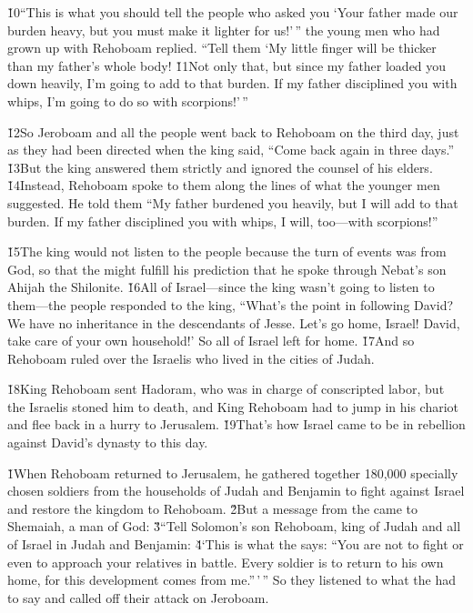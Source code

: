 \v{10}``This is what you should tell the people who asked you `Your father made our burden heavy, but you must make it lighter for us!'\,'' the young men who had grown up with Rehoboam replied. ``Tell them `My little finger will be thicker than my father's whole body! \v{11}Not only that, but since my father loaded you down heavily, I'm going to add to that burden. If my father disciplined you with whips, I'm going to do so with scorpions!'\,''

\v{12}So Jeroboam and all the people went back to Rehoboam on the third day, just as they had been directed when the king said, ``Come back again in three days.'' \v{13}But the king answered them strictly and ignored the counsel of his elders. \v{14}Instead, Rehoboam spoke to them along the lines of what the younger men suggested. He told them ``My father burdened you heavily, but I will add to that burden. If my father disciplined you with whips, I will, too---with scorpions!''

\v{15}The king would not listen to the people because the turn of events was from God, so that the  might fulfill his prediction that he spoke through Nebat's son Ahijah the Shilonite. \v{16}All of Israel---since the king wasn't going to listen to them---the people responded to the king, ``What's the point in following David? We have no inheritance in the descendants of Jesse. Let's go home, Israel! David, take care of your own household!' So all of Israel left for home. \v{17}And so Rehoboam ruled over the Israelis who lived in the cities of Judah.

\v{18}King Rehoboam sent Hadoram, who was in charge of conscripted labor, but the Israelis stoned him to death, and King Rehoboam had to jump in his chariot and flee back in a hurry to Jerusalem. \v{19}That's how Israel came to be in rebellion against David's dynasty to this day.

\v{1}When Rehoboam returned to Jerusalem, he gathered together 180,000 specially chosen soldiers from the households of Judah and Benjamin to fight against Israel and restore the kingdom to Rehoboam. \v{2}But a message from the  came to Shemaiah, a man of God: \v{3}``Tell Solomon's son Rehoboam, king of Judah and all of Israel in Judah and Benjamin: \v{4}`This is what the  says: ``You are not to fight or even to approach your relatives in battle. Every soldier is to return to his own home, for this development comes from me.''\,'\,'' So they listened to what the  had to say and called off their attack on Jeroboam.

